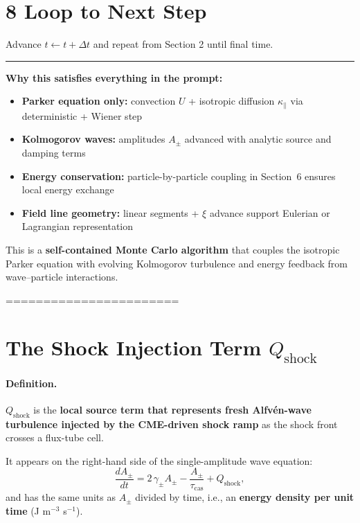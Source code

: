 \section*{8 Loop to Next Step}
Advance $t \gets t + \Delta t$ and repeat from Section 2 until final time.

\medskip

\hrule
\medskip

\textbf{Why this satisfies everything in the prompt:}
\begin{itemize}
    \item \textbf{Parker equation only:} convection $U$ + isotropic diffusion $\kappa_\parallel$ via deterministic + Wiener step
    \item \textbf{Kolmogorov waves:} amplitudes $A_\pm$ advanced with analytic source and damping terms
    \item \textbf{Energy conservation:} particle-by-particle coupling in Section~6 ensures local energy exchange
    \item \textbf{Field line geometry:} linear segments + $\xi$ advance support Eulerian or Lagrangian representation
\end{itemize}

This is a \textbf{self-contained Monte Carlo algorithm} that couples the isotropic Parker equation with evolving Kolmogorov turbulence and energy feedback from wave–particle interactions.


=======================


\section*{The Shock Injection Term $Q_{\text{shock}}$}

\paragraph{Definition.}
\textbf{$Q_{\text{shock}}$} is the \textbf{local source term that represents fresh Alfvén-wave turbulence injected by the CME-driven shock ramp} as the shock front crosses a flux-tube cell.

It appears on the right-hand side of the single-amplitude wave equation:
\begin{equation}
\frac{dA_\pm}{dt}
= 2\,\gamma_\pm A_\pm
  - \frac{A_\pm}{\tau_{\text{cas}}}
  + \boxed{Q_{\text{shock}}},
\end{equation}
and has the same units as $A_\pm$ divided by time, i.e., an \textbf{energy density per unit time} (J m$^{-3}$ s$^{-1}$).

